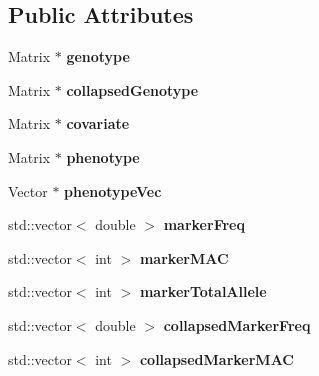 \subsection*{Public Attributes}
\begin{DoxyCompactItemize}
\item 
\hypertarget{classVCFData_af1661b9760e51b83634333b9f38c04aa}{Matrix $\ast$ {\bfseries genotype}}\label{classVCFData_af1661b9760e51b83634333b9f38c04aa}

\item 
\hypertarget{classVCFData_aff88260e91790e537e0792410fc91e93}{Matrix $\ast$ {\bfseries collapsed\-Genotype}}\label{classVCFData_aff88260e91790e537e0792410fc91e93}

\item 
\hypertarget{classVCFData_af5a6977f9f27d35395046a864d6abfc1}{Matrix $\ast$ {\bfseries covariate}}\label{classVCFData_af5a6977f9f27d35395046a864d6abfc1}

\item 
\hypertarget{classVCFData_a7502133d0c5d8dc43cf0ed75dc7f7671}{Matrix $\ast$ {\bfseries phenotype}}\label{classVCFData_a7502133d0c5d8dc43cf0ed75dc7f7671}

\item 
\hypertarget{classVCFData_a03f2924ec3a783a34fe41dc9c8eb4d2c}{Vector $\ast$ {\bfseries phenotype\-Vec}}\label{classVCFData_a03f2924ec3a783a34fe41dc9c8eb4d2c}

\item 
\hypertarget{classVCFData_a07c48779ea36732ce3b220fffed59998}{std\-::vector$<$ double $>$ {\bfseries marker\-Freq}}\label{classVCFData_a07c48779ea36732ce3b220fffed59998}

\item 
\hypertarget{classVCFData_aac73a75814ee6c2708e581f0f0b896e7}{std\-::vector$<$ int $>$ {\bfseries marker\-M\-A\-C}}\label{classVCFData_aac73a75814ee6c2708e581f0f0b896e7}

\item 
\hypertarget{classVCFData_ab4be4eca5558b91daff6ecd46517f619}{std\-::vector$<$ int $>$ {\bfseries marker\-Total\-Allele}}\label{classVCFData_ab4be4eca5558b91daff6ecd46517f619}

\item 
\hypertarget{classVCFData_a4968754b31f2e496260f391ea9b170f2}{std\-::vector$<$ double $>$ {\bfseries collapsed\-Marker\-Freq}}\label{classVCFData_a4968754b31f2e496260f391ea9b170f2}

\item 
\hypertarget{classVCFData_a56a6cb3d71011276ef5aebf1b797765f}{std\-::vector$<$ int $>$ {\bfseries collapsed\-Marker\-M\-A\-C}}\label{classVCFData_a56a6cb3d71011276ef5aebf1b797765f}


\end{DoxyCompactItemize}
